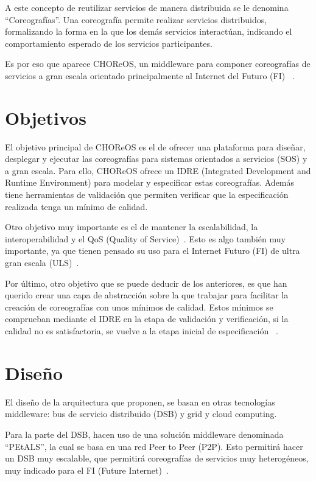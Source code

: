 \documentclass[runningheads]{llncs}
\begin{document}
A este concepto de reutilizar servicios de manera distribuida se le denomina ``Coreografías''. Una coreografía permite realizar servicios distribuidos, formalizando la forma en la que los demás servicios interactúan, indicando el comportamiento esperado de los servicios participantes. ~\cite{a_2}

Es por eso que aparece CHOReOS, un middleware para componer coreografías de servicios a gran escala orientado principalmente al Internet del Futuro (FI) ~\cite{a_1}.

\section{Objetivos}
El objetivo principal de CHOReOS es el de ofrecer una plataforma para diseñar, desplegar y ejecutar las coreografías para sistemas orientados a servicios (SOS) y a gran escala. Para ello, CHOReOS ofrece un IDRE (Integrated Development and Runtime Environment) para modelar y especificar estas coreografías. Además tiene herramientas de validación que permiten verificar que la especificación realizada tenga un mínimo de calidad. ~\cite{a_2}

Otro objetivo muy importante es el de mantener la escalabilidad, la interoperabilidad y el QoS (Quality of Service)~\cite{a_3}. Esto es algo también muy importante, ya que tienen pensado su uso para el Internet Futuro (FI) de ultra gran escala (ULS)~\cite{a_2}.

Por último, otro objetivo que se puede deducir de los anteriores, es que han querido crear una capa de abstracción sobre la que trabajar para facilitar la creación de coreografías con unos mínimos de calidad. Estos mínimos se comprueban mediante el IDRE en la etapa de validación y verificación, si la calidad no es satisfactoria, se vuelve a la etapa inicial de especificación ~\cite{a_2}.

\section{Diseño}
El diseño de la arquitectura que proponen, se basan en otras tecnologías middleware: bus de servicio distribuido (DSB) y grid y cloud computing.~\cite{a_1}

Para la parte del DSB, hacen uso de una solución middleware denominada ``PEtALS'', la cual se basa en una red Peer to Peer (P2P). Esto permitirá hacer un DSB muy escalable, que permitirá coreografías de servicios muy heterogéneos, muy indicado para el FI (Future Internet)~\cite{a_1}.
\end{document}
